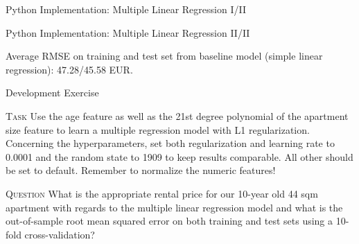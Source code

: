 \documentclass[document.tex]{subfiles}
\begin{document}
    \begin{frame}{Python Implementation: Multiple Linear Regression I/II}
        
    \end{frame}

    \begin{frame}{Python Implementation: Multiple Linear Regression II/II}
        
        Average RMSE on training and test set from baseline model (simple linear regression): 47.28/45.58 EUR.
    \end{frame}

    \begin{frame}{Development Exercise }
        \begin{alertblock}{\textsc{Task}}
            Use the age feature as well as the 21st degree polynomial of the apartment size feature to learn a multiple regression model with L1 regularization. Concerning the hyperparameters, set both regularization and learning rate to 0.0001 and the random state to 1909 to keep results comparable. All other should be set to default. Remember to normalize the numeric features!
        \end{alertblock}
        \begin{alertblock}{\textsc{Question}}
            What is the appropriate rental price for our 10-year old 44 sqm apartment with regards to the multiple linear regression model and what is the out-of-sample root mean squared error on both training and test sets using a 10-fold cross-validation?
        \end{alertblock}
    \end{frame}
\end{document}
